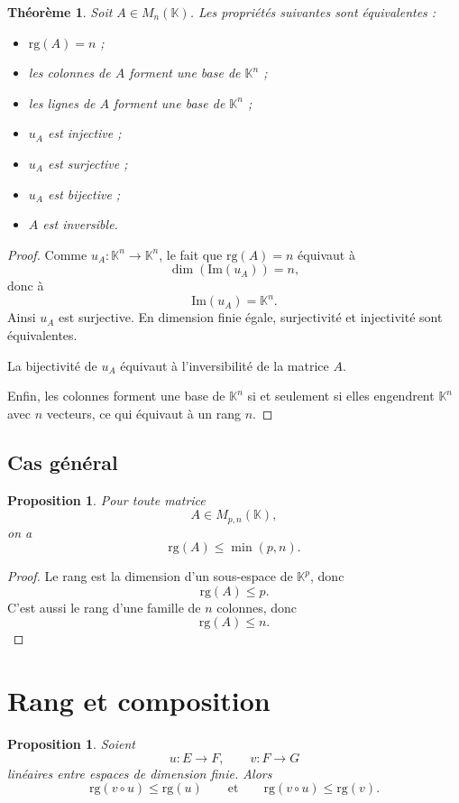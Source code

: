 \documentclass[11pt,a4paper]{article}
\newtheorem{theoreme}[definition]{Théorème}
\newtheorem{proposition}[definition]{Proposition}
\theoremstyle{remark}
\newcommand{\K}{\mathbb{K}}
\newcommand{\Img}{\mathrm{Im}}
\newcommand{\rg}{\mathrm{rg}}
\begin{document}
\begin{theoreme}
Soit \(A\in M_n(\K)\). Les propriétés suivantes sont équivalentes :
\begin{itemize}
    \item \(\rg(A)=n\) ;
    \item les colonnes de \(A\) forment une base de \(\K^n\) ;
    \item les lignes de \(A\) forment une base de \(\K^n\) ;
    \item \(u_A\) est injective ;
    \item \(u_A\) est surjective ;
    \item \(u_A\) est bijective ;
    \item \(A\) est inversible.
\end{itemize}
\end{theoreme}

\begin{proof}
Comme \(u_A:\K^n\to\K^n\), le fait que \(\rg(A)=n\) équivaut à
\[
\dim(\Img(u_A))=n,
\]
donc à
\[
\Img(u_A)=\K^n.
\]
Ainsi \(u_A\) est surjective. En dimension finie égale, surjectivité et injectivité sont équivalentes.

La bijectivité de \(u_A\) équivaut à l’inversibilité de la matrice \(A\).

Enfin, les colonnes forment une base de \(\K^n\) si et seulement si elles engendrent \(\K^n\) avec \(n\) vecteurs, ce qui équivaut à un rang \(n\).
\end{proof}

\subsection{Cas général}

\begin{proposition}
Pour toute matrice
\[
A\in M_{p,n}(\K),
\]
on a
\[
\rg(A)\le \min(p,n).
\]
\end{proposition}

\begin{proof}
Le rang est la dimension d’un sous-espace de \(\K^p\), donc
\[
\rg(A)\le p.
\]
C’est aussi le rang d’une famille de \(n\) colonnes, donc
\[
\rg(A)\le n.
\]
\end{proof}

\section{Rang et composition}

\begin{proposition}
Soient
\[
u:E\to F,
\qquad
v:F\to G
\]
linéaires entre espaces de dimension finie. Alors
\[
\rg(v\circ u)\le \rg(u)
\qquad \text{et} \qquad
\rg(v\circ u)\le \rg(v).
\]
\end{proposition}
\end{document}
